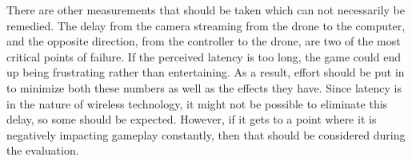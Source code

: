 \documentclass[10pt,twocolumn]{article}
\begin{document}
There are other measurements that should be taken which can not necessarily be remedied. The delay from the camera streaming from the drone to the computer, and the opposite direction, from the controller to the drone, are two of the most critical points of failure. If the perceived latency is too long, the game could end up being frustrating rather than entertaining. As a result, effort should be put in to minimize both these numbers as well as the effects they have. Since latency is in the nature of wireless technology, it might not be possible to eliminate this delay, so some should be expected. However, if it gets to a point where it is negatively impacting gameplay constantly, then that should be considered during the evaluation.


\printbibliography 
\end{document}
